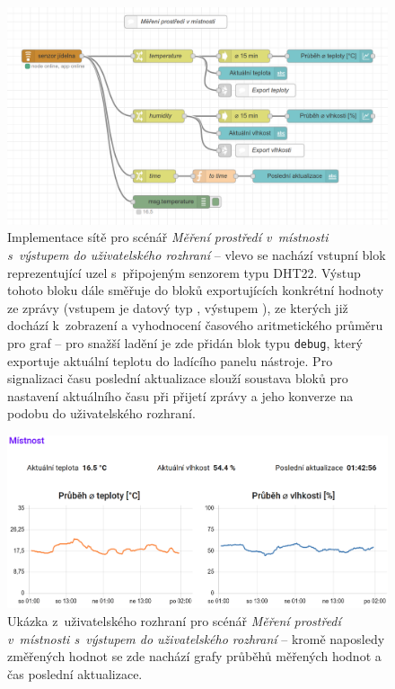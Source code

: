 \begin{figure}
    \centering
    \includegraphics[width=\textwidth]{figures/fis-flow-1.png}
    \caption{Implementace sítě pro scénář  \textit{Měření prostředí v~místnosti s~výstupem do uživatelského
    rozhraní} -- vlevo se nachází vstupní blok reprezentující uzel s~připojeným senzorem typu DHT22.
    Výstup tohoto bloku dále směřuje do bloků exportujících konkrétní hodnoty ze zprávy (vstupem je datový typ
    , výstupem ), ze kterých již dochází k~zobrazení a vyhodnocení časového aritmetického
    průměru pro graf -- pro snažší ladění je zde přidán blok typu \texttt{debug}, který exportuje aktuální teplotu
    do ladícího panelu nástroje.
    Pro signalizaci času poslední aktualizace slouží soustava bloků pro nastavení aktuálního času při přijetí zprávy
    a jeho konverze na podobu do uživatelského rozhraní.}
    \label{fig:node-red-production-1}
\end{figure}
\begin{figure}
    \centering
    \includegraphics[width=\textwidth]{figures/fis-flow-1-ui.png}
    \caption{Ukázka z~uživatelského rozhraní pro scénář \textit{Měření prostředí v~místnosti s~výstupem do
    uživatelského rozhraní} -- kromě naposledy změřených hodnot se zde nachází grafy průběhů měřených hodnot a čas
    poslední aktualizace.}
    \label{fig:node-red-production-1-ui}
\end{figure}

